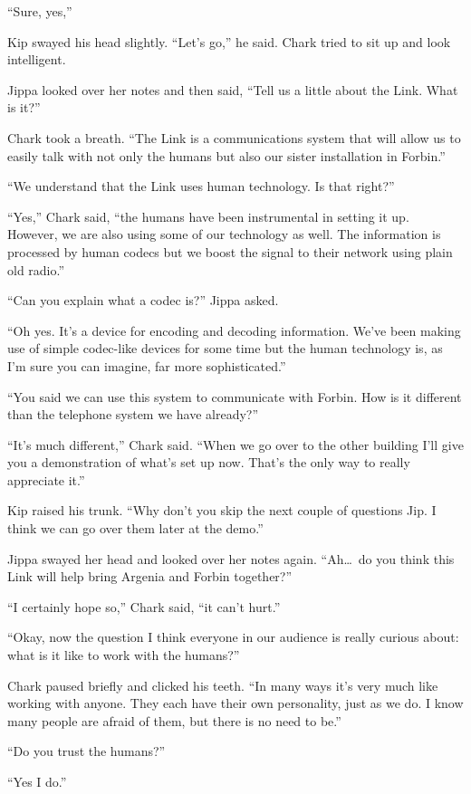 ``Sure, yes,''

Kip swayed his head slightly. ``Let's go,'' he said. Chark tried to sit up and look intelligent.

Jippa looked over her notes and then said, ``Tell us a little about the Link. What is it?''

Chark took a breath. ``The Link is a communications system that will allow us to easily talk
with not only the humans but also our sister installation in Forbin.''

``We understand that the Link uses human technology. Is that right?''

``Yes,'' Chark said, ``the humans have been instrumental in setting it up. However, we are also
using some of our technology as well. The information is processed by human codecs but we boost
the signal to their network using plain old radio.''

``Can you explain what a codec is?'' Jippa asked.

``Oh yes. It's a device for encoding and decoding information. We've been making use of simple
codec-like devices for some time but the human technology is, as I'm sure you can imagine, far
more sophisticated.''

``You said we can use this system to communicate with Forbin. How is it different than the
telephone system we have already?''

``It's much different,'' Chark said. ``When we go over to the other building I'll give you a
demonstration of what's set up now. That's the only way to really appreciate it.''

Kip raised his trunk. ``Why don't you skip the next couple of questions Jip. I think we can go
over them later at the demo.''

Jippa swayed her head and looked over her notes again. ``Ah\ldots\ do you think this Link will
help bring Argenia and Forbin together?''

``I certainly hope so,'' Chark said, ``it can't hurt.''

``Okay, now the question I think everyone in our audience is really curious about: what is it
like to work with the humans?''

Chark paused briefly and clicked his teeth. ``In many ways it's very much like working with
anyone. They each have their own personality, just as we do. I know many people are afraid of
them, but there is no need to be.''

``Do you trust the humans?''

``Yes I do.''
